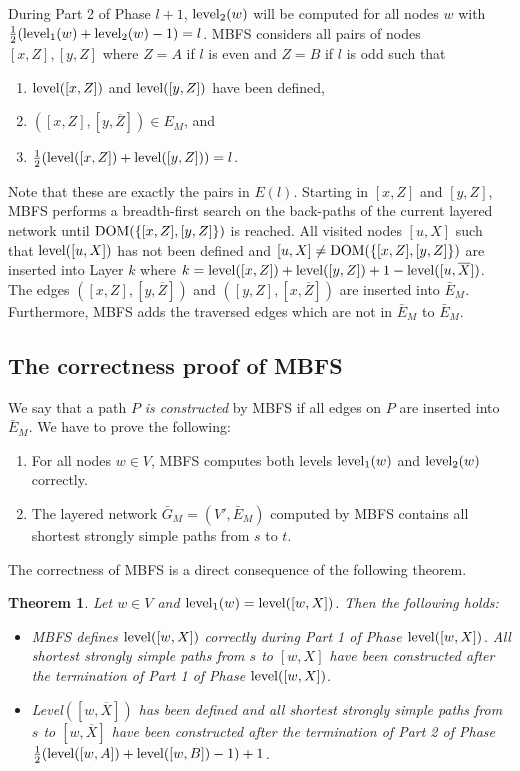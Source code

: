 \documentclass[12pt,twoside,a4paper]{article}
\newtheorem{theo}{Theorem}
\def\DOM{{\rm DOM}}
\def\lev{{\rm level}}
\begin{document}
\medskip
During Part 2 of Phase $l+1$, $\lev_2(w)$ will be computed for all nodes $w$ with
$\frac{1}{2}(\lev_1(w) + \lev_2(w) - 1) = l$. 
MBFS considers all pairs of nodes $[x,Z],[y,Z]$ where $Z = A$ if $l$ is even and 
$Z = B$ if $l$ is odd such that
\begin{enumerate}
\item
$\lev([x,Z])$ and $\lev([y,Z])$ have been defined,
\item
$([x,Z],[y,\overline{Z}]) \in E_M$, and
\item
$\frac{1}{2}(\lev([x,Z]) + \lev([y,Z])) = l$.
\end{enumerate}
Note that these are exactly the pairs in $E(l)$.
Starting in $[x,Z]$ and $[y,Z]$, MBFS performs a breadth-first search on the back-paths 
of the current layered network until $\DOM(\{[x,Z],[y,Z]\})$ is reached.
All visited nodes $[u,X]$ such that $\lev([u,X])$ has not been defined
and $[u,X] \not= \DOM(\{[x,Z],[y,Z]\})$ are inserted into Layer $k$ where
$k = \lev([x,Z]) + \lev([y,Z]) + 1 - \lev([u,\overline{X}])$. 
The edges $([x,Z],[y,\overline{Z}])$ and $([y,Z],[x,\overline{Z}])$ are inserted into 
$\bar{E}_M$. Furthermore, MBFS adds the traversed edges which are not in $\bar{E}_M$ 
to $\bar{E}_M$.

\subsection{The correctness proof of MBFS}

We say that a path $P$ {\em is constructed} by MBFS if all edges on $P$ are inserted into
$\bar{E}_M$. We have to prove the following: 
\begin{enumerate}
\item
For all nodes $w \in V$, MBFS computes both levels $\lev_1(w)$ and $\lev_2(w)$ correctly.
\item
The layered network $\bar{G}_M = (V',\bar{E}_M)$ computed by MBFS contains all shortest
strongly simple paths from $s$ to $t$.
\end{enumerate}
The correctness of MBFS is a direct consequence of the following theorem.

\begin{theo} \label{hk4}
Let $w \in V$ and $\lev_1(w) = \lev([w,X])$. Then the following holds:
\vspace{-0.2cm}
\begin{itemize}
\item[a)]
MBFS defines $\lev([w,X])$ correctly during Part 1 of Phase $\lev([w,X])$. All 
shortest strongly simple paths from $s$ to $[w,X]$ have been constructed after the 
termination of Part 1 of Phase $\lev([w,X])$. 
\vspace{-0.2cm}
\item[b)]
Level$([w,\overline{X}])$ has been defined and all shortest strongly simple paths from $s$ to 
$[w,\overline{X}]$ have been constructed after the termination of Part 2 of Phase 
$\frac{1}{2}(\lev([w,A]) + \lev([w,B]) - 1) + 1$.
\end{itemize}
\end{theo}
\end{document}
